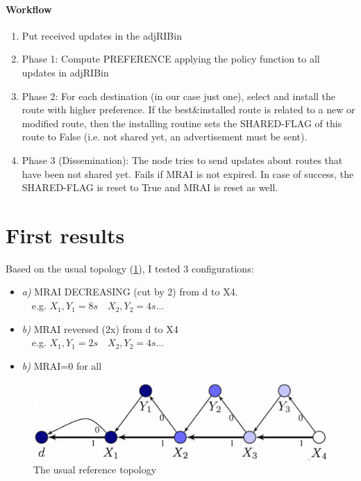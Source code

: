 \documentclass[fleqn,10pt]{SelfArx} %
\begin{document}
\paragraph{Workflow}
\begin{enumerate}[noitemsep]
  \item Put received updates in the adjRIBin
  \item Phase 1: Compute PREFERENCE applying the policy function to all updates in adjRIBin 
  \item Phase 2: For each destination (in our case just one), select and install the route with higher preference. 
    	If the best\&installed route is related to a new or modified route, then the installing routine sets the 
    	SHARED-FLAG of this route to False (i.e. not shared yet, an advertisement must be sent).
  \item Phase 3 (Dissemination): The node tries to send updates about routes that have been not shared yet. Fails if MRAI is not expired.
  		In case of success, the SHARED-FLAG is reset to True and MRAI is reset as well.
\end{enumerate}

\section{First results}

Based on the usual topology (\cref{fig:fabrex}), I tested 3 configurations:
\begin{itemize}[noitemsep]
  \item \textit{a)} MRAI DECREASING (cut by 2) from d to X4. \\$\quad$e.g. $ X_1, Y_1 = 8s \quad X_2, Y_2 = 4s$... 
  \item \textit{b)} MRAI reversed   (2x) from d to X4 \\$\quad$e.g. $ X_1, Y_1 = 2s \quad X_2, Y_2 = 4s$... 
  \item \textit{b)} MRAI=0 for all
\end{itemize}
\begin{figure}[ht]
\centering
\includegraphics[width=\linewidth]{figures/fabrex.png}
\caption{The usual reference topology}
\label{fig:fabrex}
\end{figure}
\end{document}
